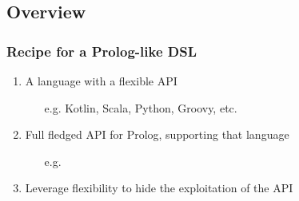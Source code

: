 \documentclass[presentation]{beamer}
\begin{document}
\subsection{Overview}

\begin{frame}%
\frametitle{Recipe for a Prolog-like DSL}

    \begin{enumerate}
        \item A language with a flexible API
        \begin{itemize}
            \item[e.g.] Kotlin, Scala, Python, Groovy, etc.
        \end{itemize}

        \vfill

        \item Full fledged API for Prolog, supporting that language
        \begin{itemize}
            \item[e.g.] \twopkt{} 
        \end{itemize}

        \vfill

        \item Leverage flexibility to hide the exploitation of the API
    \end{enumerate}

\end{frame}
\end{document}
